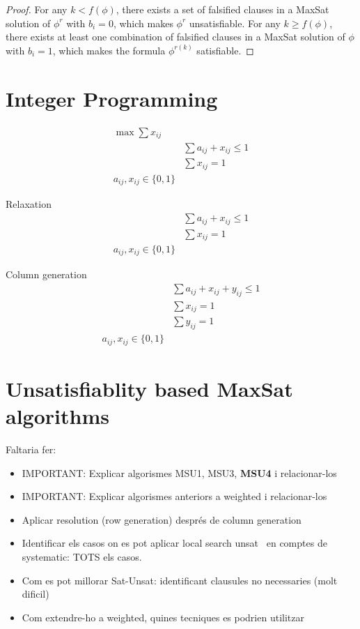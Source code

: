 \documentclass[runningheads,a4paper]{llncs}
\begin{document}
\begin{proof}
For any $k<f(\phi)$, there exists a set of falsified clauses in a MaxSat solution of $\phi^r$ with
$b_i=0$, which makes $\phi^r$ unsatisfiable.
For any $k \ge f(\phi)$, there exists at least one combination of
falsified clauses in a MaxSat solution of $\phi$
with $b_i=1$, which makes the formula $\phi^{r(k)}$ satisfiable.
\end{proof}

\section{Integer Programming}

$$
\begin{array}{ll}
\max \sum x_{ij}\\
& \sum a_{ij} + x_{ij} \le 1 \\
& \sum x_{ij} = 1 \\
a_{ij}, x_{ij} \in \{0,1\} 
\end{array}
$$

Relaxation
$$
\begin{array}{ll}
& \sum a_{ij} + x_{ij} \le 1 \\
& \sum x_{ij} = 1 \\
a_{ij}, x_{ij} \in \{0,1\} 
\end{array}
$$

Column generation
$$
\begin{array}{ll}
& \sum a_{ij} + x_{ij} + y_{ij}\le 1 \\
& \sum x_{ij} = 1 \\
& \sum y_{ij} = 1 \\
a_{ij}, x_{ij} \in \{0,1\} 
\end{array}
$$

\section{Unsatisfiablity based MaxSat algorithms}

Faltaria fer:
\begin{itemize}
\item IMPORTANT: Explicar algorismes MSU1, MSU3, \textbf{MSU4} i
  relacionar-los
\item IMPORTANT: Explicar algorismes anteriors a weighted i
  relacionar-los
\item Aplicar resolution (row generation) després de column generation
\item Identificar els casos on es pot aplicar local search unsat~\cite{AS07} en
  comptes de systematic: TOTS els casos.
\item Com es pot millorar Sat-Unsat: identificant clausules no necessaries (molt dificil)
\item Com extendre-ho a weighted, quines tecniques es podrien utilitzar
\end{itemize}


\end{document}
